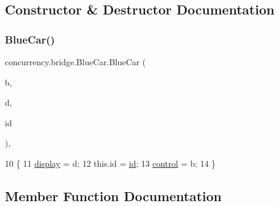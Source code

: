 \subsection{Constructor \& Destructor Documentation}
\mbox{\label{classconcurrency_1_1bridge_1_1_blue_car_a2d4360a4d3ac41e63613fe7aa9085aca}} 
\subsubsection{\texorpdfstring{Blue\+Car()}{BlueCar()}}
{\footnotesize\ttfamily concurrency.\+bridge.\+Blue\+Car.\+Blue\+Car (\begin{DoxyParamCaption}\item[{\mbox{\hyperlink{classconcurrency_1_1bridge_1_1_bridge}{Bridge}}}]{b,  }\item[{\mbox{\hyperlink{classconcurrency_1_1bridge_1_1_bridge_canvas}{Bridge\+Canvas}}}]{d,  }\item[{int}]{id }\end{DoxyParamCaption})\hspace{0.3cm}{\ttfamily [inline]}, {\ttfamily [package]}}


\begin{DoxyCode}
10                                               \{
11         \mbox{\hyperlink{classconcurrency_1_1bridge_1_1_blue_car_ae92ab1f7f39265be8271d7b7affdc5e2}{display}} = d;
12         this.\textcolor{keywordtype}{id} = \mbox{\hyperlink{classconcurrency_1_1bridge_1_1_blue_car_aa1067ebee91729df39dc3171168f8dfc}{id}};
13         \mbox{\hyperlink{classconcurrency_1_1bridge_1_1_blue_car_aabbbdb924664b29e7a682e55862112aa}{control}} = b;
14     \}
\end{DoxyCode}


\subsection{Member Function Documentation}
\mbox{\label{classconcurrency_1_1bridge_1_1_blue_car_a84ca0b197c2136a10ab48951d3de37e6}} 
